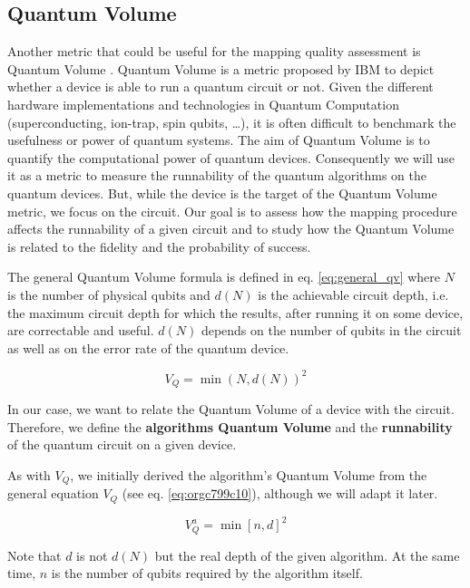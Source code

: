 \subsection{Quantum Volume}
\label{sec:org3029336}

Another metric that could be useful for the mapping quality assessment is Quantum Volume \cite{Bishop_2017,Moll_2018}.
Quantum Volume is a metric proposed by IBM to depict whether a device is able to run a quantum circuit or not.
Given the different hardware implementations and technologies in Quantum Computation (superconducting, ion-trap, spin qubits, \ldots{}), it is often difficult to benchmark the usefulness or power of quantum systems. 
The aim of Quantum Volume is to quantify the computational power of quantum devices. 
Consequently we will use it as a metric to measure the runnability of the quantum algorithms on the quantum devices.
But, while the device is the target of the Quantum Volume metric, we focus on the circuit.
Our goal is to assess how the mapping procedure affects the runnability of a given circuit and to study how the Quantum Volume is related to the fidelity and the probability of success.

The general Quantum Volume formula is defined in eq. \ref{eq:general_qv} where \(N\) is the number of physical qubits and \(d(N)\) is the achievable circuit depth, i.e. the maximum circuit depth for which the results, after running it on some device, are correctable and useful.
\(d(N)\) depends on the number of qubits in the circuit as well as on the error rate of the quantum device.

\begin{equation}
\label{eq:general_qv}
V_Q = \min (N, d(N))^2
\end{equation}

In our case, we want to relate the Quantum Volume of a device with the circuit.
Therefore, we define the \textbf{algorithms Quantum Volume} and the \textbf{runnability} of the quantum circuit on a given device.

As with \(V_Q\), we initially derived the algorithm's Quantum Volume from the general equation \(V_Q\) (see eq. \ref{eq:orgc799c10}), although we will adapt it later.

\begin{equation}
\label{eq:orgc799c10}
V_Q^a = \min \left[ n,d \right]^2
\end{equation}

Note that \(d\) is not \(d(N)\) but the real depth of the given algorithm.
At the same time, \(n\) is the number of qubits required by the algorithm itself.

